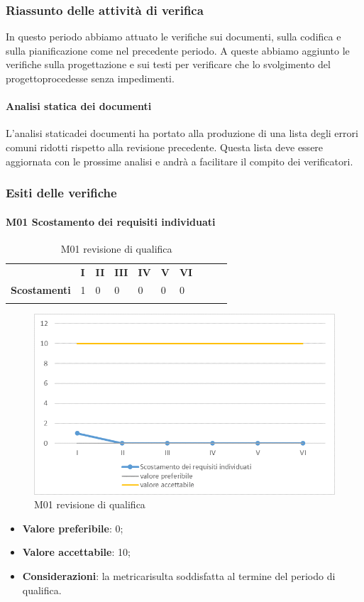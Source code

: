 \subsubsection{Riassunto delle attività di verifica}
In questo periodo abbiamo attuato le verifiche sui documenti, sulla codifica e sulla pianificazione come nel precedente periodo. A queste abbiamo aggiunto le verifiche sulla progettazione e sui testi per verificare che lo svolgimento del progetto\glosp procedesse senza impedimenti.  
\paragraph{Analisi statica dei documenti}
L'analisi statica\glosp dei documenti ha portato alla produzione di una lista degli errori comuni ridotti rispetto alla revisione precedente. Questa lista deve essere aggiornata con le prossime analisi e andrà a facilitare il compito dei verificatori.
\subsubsection{Esiti delle verifiche} 
\paragraph{M01 Scostamento dei requisiti individuati} \mbox{}
\begin{longtable}[H!] {						
		>{}p{50mm}  		
		>{}p{8mm}
		>{}p{8mm}		
		>{}p{8mm}		
		>{}p{8mm}		
		>{}p{8mm}		
		>{}p{8mm}
		>{}p{8mm}
		>{}p{8mm}
		>{}p{8mm}
	}
	\rowcolor{gray!50}
	\textbf{} & \textbf{I} & \textbf{II} & \textbf{III} & \textbf{IV} & \textbf{V} & \textbf{VI} \TBstrut \\ [2mm]
	\textbf{Scostamenti} & 1 & 0 & 0 & 0 & 0 & 0 \TBstrut \\ [2mm]
	\rowcolor{white}
	\caption{M01 revisione di qualifica}
\end{longtable}
\begin{figure}[H] 	
	\includegraphics[width=\linewidth]{./img/grafici/RQ1.png}	
	\caption{M01 revisione di qualifica}	
\end{figure}
\begin{itemize}
	\item \textbf{Valore preferibile}: 0;
	\item \textbf{Valore accettabile}: 10;
	\item \textbf{Considerazioni}: la metrica\glosp risulta soddisfatta al termine del periodo di qualifica.
\end{itemize}

